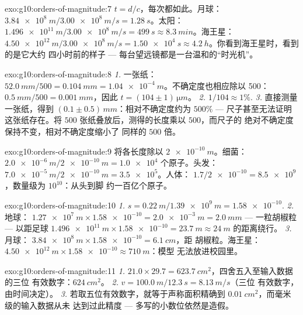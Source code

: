 \begin{solution}{exo:g10:orders-of-magnitude:7}
$t = d/c$，每次都如此。月球：
$\qty{3.84e8}{m}/\qty{3.00e8}{m/s} = \qty{1.28}{s}$。太阳：
$\qty{1.496e11}{m}/\qty{3.00e8}{m/s} = \qty{499}{s} \approx
\qty{8.3}{min}$。海王星：
$\qty{4.50e12}{m}/\qty{3.00e8}{m/s} = \qty{1.50e4}{s} \approx
\qty{4.2}{h}$。你看到海王星时，看到的是它大约
四小时前的样子 --- 每台望远镜都是一台温和的“时光机”。
\end{solution}

\begin{solution}{exo:g10:orders-of-magnitude:8}
\emph{1.} 一张纸：$\qty{52.0}{mm}/500 = \qty{0.104}{mm}
= \qty{1.04e-4}{m}$。不确定度也相应除以 500：
$\qty{0.5}{mm}/500 = \qty{0.001}{mm}$，因此
$t = (104 \pm 1)\,\unit{\micro m}$。
\emph{2.} $1/104 \approx 1\%$.
\emph{3.} 直接测量一张纸，得到
$(0.1 \pm 0.5)\,\unit{mm}$：相对不确定度约为 $500\%$
--- 尺子甚至无法证明这张纸存在。将 $500$
张纸叠放后，测得的长度乘以 $500$，而尺子的
绝对不确定度保持不变，相对不确定度缩小了
同样的 $500$ 倍。
\end{solution}

\begin{solution}{exo:g10:orders-of-magnitude:9}
将各长度除以 $\qty{2e-10}{m}$。细菌：
$\qty{2.0e-6}{m}/\qty{2e-10}{m} = \num{1.0e4}$ 个原子。头发：
$\qty{7.0e-5}{m}/\qty{2e-10}{m} = \num{3.5e5}$。人体：
$1.7/\num{2e-10} = \num{8.5e9}$，数量级为 $10^{10}$：从头到脚
约一百亿个原子。
\end{solution}

\begin{solution}{exo:g10:orders-of-magnitude:10}
\emph{1.} $s = \qty{0.22}{m}/\qty{1.39e9}{m} = \num{1.58e-10}$.
\emph{2.} 地球：
$\qty{1.27e7}{m} \times \num{1.58e-10} = \qty{2.0e-3}{m} =
\qty{2.0}{mm}$ --- 一粒胡椒粒 --- 以距足球
$\qty{1.496e11}{m} \times \num{1.58e-10} = \qty{23.7}{m} \approx
\qty{24}{m}$ 的距离绕行。
\emph{3.} 月球：
$\qty{3.84e8}{m} \times \num{1.58e-10} = \qty{6.1}{cm}$，距
胡椒粒。海王星：
$\qty{4.50e12}{m} \times \num{1.58e-10} \approx \qty{710}{m}$：模型
无法放进校园里。
\end{solution}

\begin{solution}{exo:g10:orders-of-magnitude:11}
\emph{1.} $21.0 \times 29.7 = \qty{623.7}{cm^2}$，四舍五入至输入数据的三位
有效数字：$\qty{624}{cm^2}$。
\emph{2.} $v = \qty{100.0}{m}/\qty{12.3}{s} = \qty{8.13}{m/s}$（三位
有效数字，由时间决定）。
\emph{3.} 若取五位有效数字，就等于声称面积精确到
$\qty{0.01}{cm^2}$，而毫米级的输入数据从未
达到过此精度 --- 多写的小数位依然是造假。
\end{solution}


